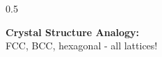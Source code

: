 \documentclass[aspectratio=169,10pt]{beamer}
\newcommand{\teaching}[1]{}
\theoremstyle{plain}
\begin{document}
\begin{frame}
\begin{columns}[T]
\begin{column}{0.5\textwidth}
    
    \vspace{0.3cm}
    
    \textbf{Crystal Structure Analogy:}\\
    FCC, BCC, hexagonal - all lattices!
  
    \end{column}
  \end{columns}
  
  \teaching{Connect to familiar physics concepts}
\end{frame}

\end{document}
